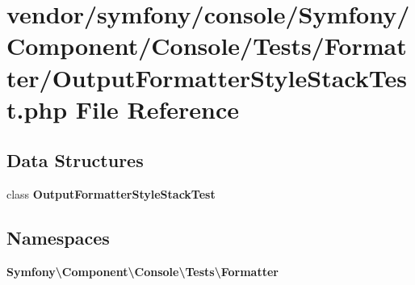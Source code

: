 \section{vendor/symfony/console/\+Symfony/\+Component/\+Console/\+Tests/\+Formatter/\+Output\+Formatter\+Style\+Stack\+Test.php File Reference}
\label{_output_formatter_style_stack_test_8php}
\subsection*{Data Structures}
\begin{DoxyCompactItemize}
\item 
class {\bf Output\+Formatter\+Style\+Stack\+Test}
\end{DoxyCompactItemize}
\subsection*{Namespaces}
\begin{DoxyCompactItemize}
\item 
 {\bf Symfony\textbackslash{}\+Component\textbackslash{}\+Console\textbackslash{}\+Tests\textbackslash{}\+Formatter}
\end{DoxyCompactItemize}
